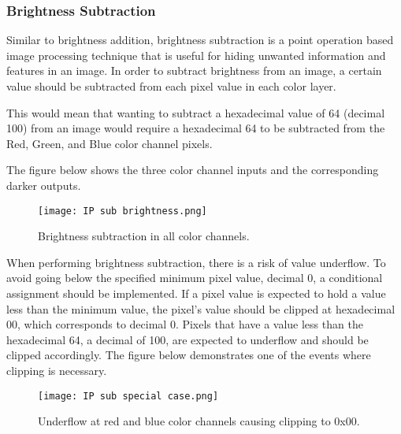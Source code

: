 \subsubsection{Brightness Subtraction}
\par Similar to brightness addition, brightness subtraction is a point operation based image processing technique that is useful for hiding unwanted information and features in an image. In order to subtract brightness from an image, a certain value should be subtracted from each pixel value in each color layer.  \newline
\par This would mean that wanting to subtract a hexadecimal value of 64 (decimal 100) from an image would require a hexadecimal 64 to be subtracted from the Red, Green, and Blue color channel pixels. \newline
\par The figure below shows the three color channel inputs and the corresponding darker outputs. \newline

\begin{figure}[H]
	\centering
	\texttt{[image: IP sub brightness.png]}
	\caption{Brightness subtraction in all color channels.}
	\label{fig:ipsubbrightness}  
\end{figure}

\par When performing brightness subtraction, there is a risk of value underflow. To avoid going below the specified minimum pixel value, decimal 0, a conditional assignment should be implemented. If a pixel value is expected to hold a value less than the minimum value, the pixel's value should be clipped at hexadecimal 00, which corresponds to decimal 0. Pixels that have a value less than the hexadecimal 64, a decimal of 100, are expected to underflow and should be clipped accordingly. The figure below demonstrates one of the events where clipping is necessary. \newline

\begin{figure}[H]
	\centering
	\texttt{[image: IP sub special case.png]}
	\caption{Underflow at red and blue color channels causing clipping to 0x00.}
	\label{fig:ipsubbrightnesscase}  
\end{figure}

